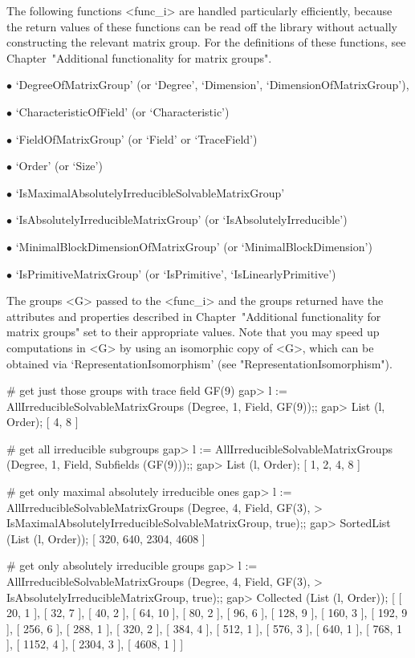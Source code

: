 The following functions <func_i> are handled particularly efficiently, because the
return values of these functions can be read off the
{\IRREDSOL} library without actually constructing the relevant matrix group. For the
definitions of these functions, see Chapter~"Additional functionality for matrix
groups".

\beginlist

\item{$\bullet$} `DegreeOfMatrixGroup' (or `Degree', `Dimension',
`DimensionOfMatrixGroup'), 
\item{$\bullet$} `CharacteristicOfField' (or `Characteristic')
\item{$\bullet$} `FieldOfMatrixGroup' (or `Field' or `TraceField')
\item{$\bullet$} `Order' (or `Size')
\item{$\bullet$} `IsMaximalAbsolutelyIrreducibleSolvableMatrixGroup' 
\item{$\bullet$} `IsAbsolutelyIrreducibleMatrixGroup' (or
`IsAbsolutelyIrreducible')
\item{$\bullet$} `MinimalBlockDimensionOfMatrixGroup' (or
`MinimalBlockDimension')
\item{$\bullet$} `IsPrimitiveMatrixGroup' (or `IsPrimitive',
`IsLinearlyPrimitive')

\endlist
The groups <G> passed to the <func_i> and the groups returned have the attributes and properties described in 
Chapter~"Additional functionality for matrix groups" set to their appropriate values.
Note that you may speed up computations in <G> by using an isomorphic copy of <G>, which can be obtained via `RepresentationIsomorphism' (see "RepresentationIsomorphism").

\beginexample
# get just those groups with trace field GF(9)
gap> l := AllIrreducibleSolvableMatrixGroups (Degree, 1, Field, GF(9));;
gap> List (l, Order);
[ 4, 8 ]

# get all irreducible subgroups
gap> l := AllIrreducibleSolvableMatrixGroups (Degree, 1, Field, Subfields (GF(9)));;
gap> List (l, Order);
[ 1, 2, 4, 8 ]

# get only maximal absolutely irreducible ones
gap> l := AllIrreducibleSolvableMatrixGroups (Degree, 4, Field, GF(3),
>             IsMaximalAbsolutelyIrreducibleSolvableMatrixGroup, true);;
gap> SortedList (List (l, Order));
[ 320, 640, 2304, 4608 ]

# get only absolutely irreducible groups
gap> l := AllIrreducibleSolvableMatrixGroups (Degree, 4, Field, GF(3),
> IsAbsolutelyIrreducibleMatrixGroup, true);;
gap> Collected (List (l, Order));
[ [ 20, 1 ], [ 32, 7 ], [ 40, 2 ], [ 64, 10 ], [ 80, 2 ], [ 96, 6 ], 
  [ 128, 9 ], [ 160, 3 ], [ 192, 9 ], [ 256, 6 ], [ 288, 1 ], [ 320, 2 ], 
  [ 384, 4 ], [ 512, 1 ], [ 576, 3 ], [ 640, 1 ], [ 768, 1 ], [ 1152, 4 ], 
  [ 2304, 3 ], [ 4608, 1 ] ]
\endexample


